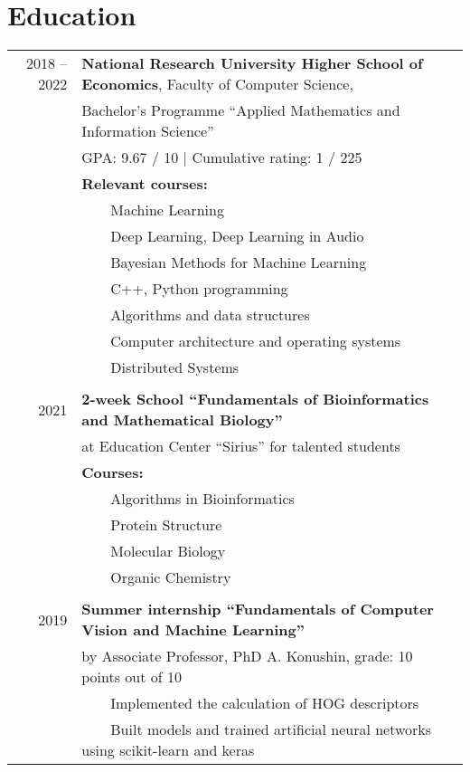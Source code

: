 \documentclass[a4paper,10pt]{article}
\newcommand{\tabitem}{~~\llap{\textbullet}~~}
\begin{document}
\section{Education}
\begin{tabular}{rl}	
2018 -- 2022 & \textbf{National Research University Higher School of Economics}, Faculty of Computer Science, \\ & Bachelor’s Programme “Applied Mathematics and Information Science”\\
& GPA: 9.67 / 10 | Cumulative rating: 1 / 225 \\
& \textbf{Relevant courses:}\\
& \tabitem Machine Learning \\
& \tabitem Deep Learning, Deep Learning in Audio \\
& \tabitem Bayesian Methods for Machine Learning \\
& \tabitem C++, Python programming \\
& \tabitem Algorithms and data structures \\
& \tabitem Computer architecture and operating systems \\
& \tabitem Distributed Systems \\
& \\
2021 & \textbf{2-week School ``Fundamentals of Bioinformatics and Mathematical Biology''} \\
& at Education Center ``Sirius'' for talented students \\
& \textbf{Courses:}\\
& \tabitem Algorithms in Bioinformatics \\
& \tabitem Protein Structure \\
& \tabitem Molecular Biology \\
& \tabitem Organic Chemistry \\
& \\
2019 & \textbf{Summer internship “Fundamentals of Computer Vision and Machine Learning”} \\
& by Associate Professor, PhD A. Konushin, grade: 10 points out of 10 \\
& \tabitem Implemented the calculation of HOG descriptors \\
& \tabitem Built models and trained artificial neural networks using scikit-learn and keras 
\end{tabular}
\end{document}
